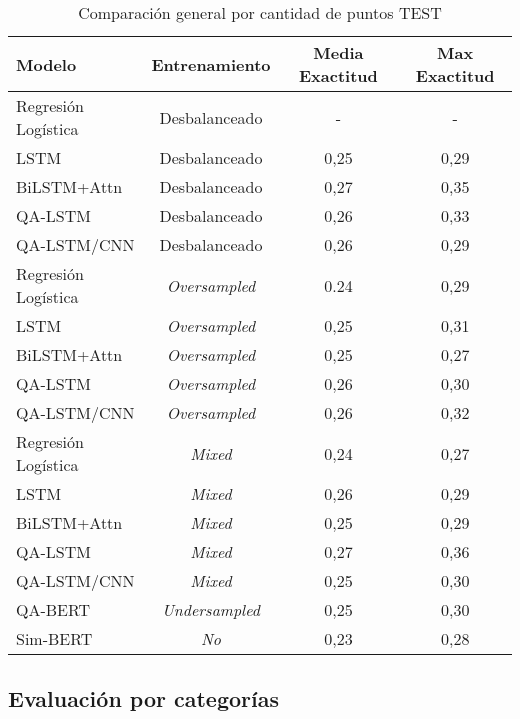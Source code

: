 \begin{table}[!tb]
  \begin{center}
    \caption{Comparación general por cantidad de puntos TEST}
    \begin{tabular}{l|c|c|c}
      \textbf{Modelo} & \textbf{Entrenamiento} & \textbf{Media Exactitud} & \textbf{Max Exactitud}\\
      \hline
      Regresión Logística & Desbalanceado & - & - \\
      LSTM & Desbalanceado & 0,25 & 0,29 \\
      BiLSTM+Attn & Desbalanceado & 0,27 & 0,35 \\
      QA-LSTM & Desbalanceado & 0,26 & 0,33 \\
      QA-LSTM/CNN & Desbalanceado & 0,26 & 0,29 \\

      Regresión Logística & \textit{Oversampled} & 0.24 & 0,29 \\
      LSTM & \textit{Oversampled} & 0,25 & 0,31 \\
      BiLSTM+Attn & \textit{Oversampled} & 0,25 & 0,27 \\
      QA-LSTM & \textit{Oversampled} & 0,26 & 0,30 \\
      QA-LSTM/CNN & \textit{Oversampled} & 0,26 & 0,32 \\

      Regresión Logística & \textit{Mixed} & 0,24 & 0,27 \\
      LSTM & \textit{Mixed} & 0,26 & 0,29 \\
      BiLSTM+Attn & \textit{Mixed} & 0,25 & 0,29 \\
      QA-LSTM & \textit{Mixed} & 0,27 & 0,36 \\
      QA-LSTM/CNN & \textit{Mixed} & 0,25 & 0,30 \\

      QA-BERT & \textit{Undersampled} & 0,25 & 0,30 \\
      Sim-BERT & \textit{No} & 0,23 & 0,28 \\
    \end{tabular}
  \end{center}
  \label{comparison_acc_general}
\end{table}


\subsection{Evaluación por categorías}





